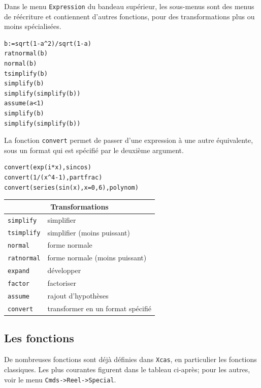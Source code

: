 \documentclass{article}
\begin{document}
Dans le menu \verb|Expression| du bandeau sup\'erieur, les sous-menus sont
des menus de r\'e\'ecriture et contiennent d'autres fonctions, pour des 
transformations plus ou moins sp\'ecialis\'ees.  
\begin{verbatim}
b:=sqrt(1-a^2)/sqrt(1-a)
ratnormal(b)
normal(b)
tsimplify(b)
simplify(b)
simplify(simplify(b))
assume(a<1)
simplify(b)   
simplify(simplify(b))
\end{verbatim}
La fonction \verb|convert| permet de passer d'une expression \`a une
autre \'equivalente, sous un format qui est sp\'ecifi\'e par le
deuxi\`eme argument. 
\begin{verbatim}
convert(exp(i*x),sincos)
convert(1/(x^4-1),partfrac)
convert(series(sin(x),x=0,6),polynom)
\end{verbatim}

\begin{center}
\begin{tabular}{|ll|}
\hline
\multicolumn{2}{|c|}{\bf Transformations}\\
\hline\hline
\verb|simplify|& simplifier\\
\verb|tsimplify|& simplifier (moins puissant)\\
\verb|normal|& forme normale\\
\verb|ratnormal|& forme normale (moins puissant)\\
\verb|expand|& d\'evelopper\\
\verb|factor|& factoriser\\
\verb|assume|& rajout d'hypoth\`eses\\
\verb|convert|& transformer en un format sp\'ecifi\'e\\
\hline
\end{tabular}
\end{center}
%
\subsection{Les fonctions}
%
De nombreuses fonctions sont d\'ej\`a d\'efinies dans {\tt Xcas}, en
particulier les fonctions classiques. Les plus courantes figurent dans
le tableau ci-apr\`es; pour les autres, voir le menu \verb|Cmds->Reel->Special|.\\
\end{document}
